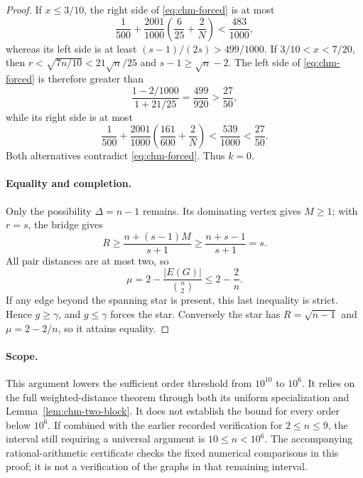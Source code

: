 \documentclass[11pt,a4paper]{article}
\theoremstyle{remark}\newtheorem{remark}[theorem]{Remark}
\begin{document}
\begin{proof}
If $x\le3/10$, the right side of \eqref{eq:chm-forced} is at most
\[
 \frac1{500}+\frac{2001}{1000}
          \left(\frac6{25}+\frac2N\right)
 <\frac{483}{1000},
\]
whereas its left side is at least
$(s-1)/(2s)>499/1000$. If $3/10<x<7/20$, then
$r<\sqrt{7n/10}<21\sqrt n/25$ and $s-1\ge\sqrt n-2$.
The left side of \eqref{eq:chm-forced} is therefore greater than
\[
 \frac{1-2/1000}{1+21/25}
   =\frac{499}{920}>\frac{27}{50},
\]
while its right side is at most
\[
 \frac1{500}+\frac{2001}{1000}
          \left(\frac{161}{600}+\frac2N\right)
 <\frac{539}{1000}<\frac{27}{50}.
\]
Both alternatives contradict \eqref{eq:chm-forced}. Thus $k=0$.

\paragraph{Equality and completion.}
Only the possibility $\Delta=n-1$ remains. Its dominating vertex
gives $M\ge1$; with $r=s$, the bridge gives
\[
 R\ge\frac{n+(s-1)M}{s+1}
       \ge\frac{n+s-1}{s+1}=s.
\]
All pair distances are at most two, so
\[
 \mu=2-\frac{|E(G)|}{\binom n2}\le2-\frac2n.
\]
If any edge beyond the spanning star is present, this last inequality
is strict. Hence $g\ge\gamma$, and $g\le\gamma$ forces the star.
Conversely the star has $R=\sqrt{n-1}$ and
$\mu=2-2/n$, so it attains equality.
\end{proof}

\paragraph{Scope.}
This argument lowers the sufficient order threshold from $10^{10}$
to $10^6$. It relies on the full weighted-distance theorem through
both its uniform specialization and Lemma~\ref{lem:chm-two-block}.
It does not establish the bound for every order below $10^6$.
If combined with the earlier recorded verification for $2\le n\le9$,
the interval still requiring a universal argument is
$10\le n<10^6$. The accompanying rational-arithmetic certificate
checks the fixed numerical comparisons in this proof; it is not
a verification of the graphs in that remaining interval.

\end{document}
